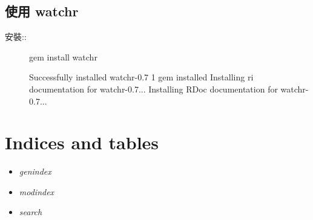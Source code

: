 \documentclass[a4paper,12pt,english]{sphinxmanual}
\begin{document}
\section{使用 watchr}
\label{sphinx_watchr::doc}\label{sphinx_watchr:watchr}\begin{description}
\item[{安裝::}] \leavevmode
gem install watchr

Successfully installed watchr-0.7
1 gem installed
Installing ri documentation for watchr-0.7...
Installing RDoc documentation for watchr-0.7...

\end{description}


\chapter{Indices and tables}
\label{index:indices-and-tables}\begin{itemize}
\item {} 
\emph{genindex}

\item {} 
\emph{modindex}

\item {} 
\emph{search}

\end{itemize}



\renewcommand{\indexname}{Index}
\printindex
\end{document}
